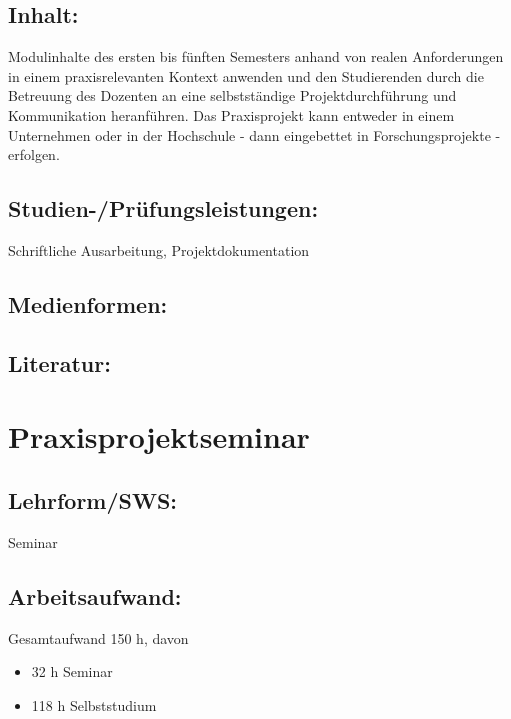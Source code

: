 \section{Inhalt:}\label{inhalt-18}

Modulinhalte des ersten bis fünften Semesters anhand von realen
Anforderungen in einem praxisrelevanten Kontext anwenden und den
Studierenden durch die Betreuung des Dozenten an eine selbstständige
Projektdurchführung und Kommunikation heranführen. Das Praxisprojekt
kann entweder in einem Unternehmen oder in der Hochschule - dann
eingebettet in Forschungsprojekte - erfolgen.

\section{Studien-/Prüfungsleistungen:}\label{studien-pruxfcfungsleistungen-18}

Schriftliche Ausarbeitung, Projektdokumentation

\section{Medienformen:}\label{medienformen-18}

\section{Literatur:}\label{literatur-18}

\chapter{Praxisprojektseminar}\label{praxisprojektseminar}

\section{Lehrform/SWS:}\label{lehrformsws-19}

Seminar

\section{Arbeitsaufwand:}\label{arbeitsaufwand-19}

Gesamtaufwand 150 h, davon

\begin{itemize}
\tightlist
\item
  32 h Seminar
\item
  118 h Selbststudium
\end{itemize}

